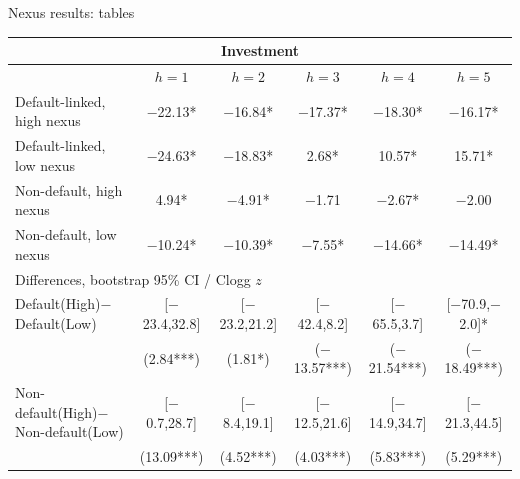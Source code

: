 \documentclass[aspectratio=169]{beamer}
\begin{document}
\begin{frame}{Nexus results: tables}
  \tiny
  \begin{center}
  \begin{tabular*}{0.92\linewidth}{@{\extracolsep{\fill}}lccccc}
  \multicolumn{6}{c}{\normalsize Investment} \\
  \toprule
   & $h=1$ & $h=2$ & $h=3$ & $h=4$ & $h=5$ \\
  \midrule
  Default-linked, high nexus & $-$22.13* & $-$16.84* & $-$17.37* & $-$18.30* & $-$16.17* \\
  Default-linked, low nexus & $-$24.63* & $-$18.83* & 2.68* & 10.57* & 15.71* \\
  Non-default, high nexus & 4.94* & $-$4.91* & $-$1.71 & $-$2.67* & $-$2.00 \\
  Non-default, low nexus & $-$10.24* & $-$10.39* & $-$7.55* & $-$14.66* & $-$14.49* \\
  \midrule
  \multicolumn{6}{l}{Differences, bootstrap 95\% CI / Clogg $z$} \\[1pt]
  Default(High)$-$Default(Low) & [$-$23.4,32.8] & [$-$23.2,21.2] & [$-$42.4,8.2] & [$-$65.5,3.7] & [$-$70.9,$-$2.0]* \\
   & (2.84***) & (1.81*) & ($-$13.57***) & ($-$21.54***) & ($-$18.49***) \\[2pt]
  Non-default(High)$-$Non-default(Low) & [$-$0.7,28.7] & [$-$8.4,19.1] & [$-$12.5,21.6] & [$-$14.9,34.7] & [$-$21.3,44.5] \\
   & (13.09***) & (4.52***) & (4.03***) & (5.83***) & (5.29***) \\
  \bottomrule
  \end{tabular*}
  \end{center}
\end{frame}
\end{document}
